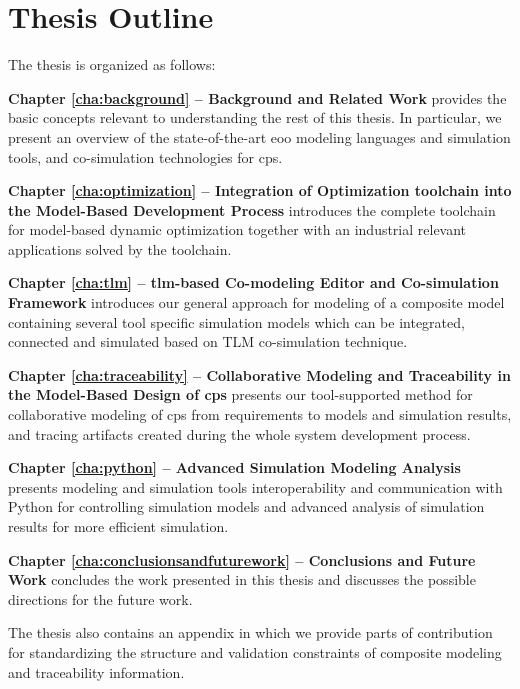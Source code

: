 \section{Thesis Outline}
\label{sec:Thesis Outline}

The thesis is organized as follows:

\begin{description}
	
\item \textbf{Chapter \ref{cha:background} – Background and Related Work } provides the basic concepts relevant to understanding the rest of this thesis.  In particular, we present an overview of the state-of-the-art \acrshort{eoo} modeling languages and simulation tools, and co-simulation technologies for \acrshort{cps}. 

\item \textbf{Chapter \ref{cha:optimization} – Integration of Optimization toolchain into the Model-Based Development Process} introduces the complete toolchain for model-based dynamic optimization together with an industrial relevant applications solved by the toolchain.

\item \textbf{Chapter \ref{cha:tlm} – \acrshort{tlm}-based Co-modeling Editor and Co-simulation Framework} introduces our general approach for modeling of a composite model containing several tool specific simulation models which can be integrated, connected and simulated based on TLM co-simulation technique.

\item \textbf{Chapter \ref{cha:traceability} – Collaborative Modeling and Traceability in the Model-Based Design of \acrshort{cps}} presents our tool-supported method for collaborative modeling of \acrshort{cps} from requirements to models and simulation results, and tracing artifacts created during the whole system development process.  

\item \textbf{Chapter \ref{cha:python} – Advanced Simulation Modeling Analysis} presents modeling and simulation tools interoperability and communication with Python for controlling simulation models and advanced analysis of simulation results for more efficient simulation.

\item \textbf{Chapter \ref{cha:conclusionsandfuturework} – Conclusions and Future Work} concludes the work presented in this thesis and discusses the possible directions for the future work.

\end{description}

The thesis also contains an appendix in which we provide parts of contribution for standardizing the structure and validation constraints of composite modeling and traceability information.




